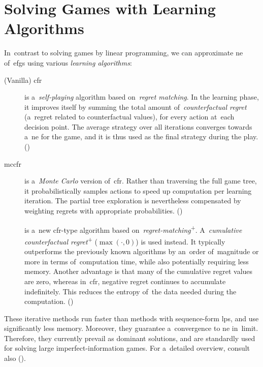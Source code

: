 \section{Solving Games with Learning Algorithms}
In~contrast to solving games by linear programming, we can approximate \acrlong{ne} of~\acrshort{efg}s using various \emph{learning algorithms}:
\begin{description}
  \item [(Vanilla) \acrfull{cfr}] is a~\emph{self-playing} algorithm based on~\emph{regret matching}.
    In the learning phase, it improves itself by summing the total amount of~\emph{counterfactual regret} (a~regret related to counterfactual values), for every action at~each decision point.
    The average strategy over all iterations converges towards a~\acrshort{ne} for the game, and it is thus used as the final strategy during the play.
    (\cite{Zinkevich2007regret})

  \item [\acrfull{mccfr}] is a~\emph{Monte Carlo} version of~\acrshort{cfr}.
    Rather than traversing the full game tree, it probabilistically samples actions to speed up computation per learning iteration.
    The partial tree exploration is nevertheless compensated by weighting regrets with appropriate probabilities.
    (\cite{Johanson2012efficient})

  \item [\cfrplus] is a~new \acrshort{cfr}-type algorithm based on~\emph{regret-matching}\textsuperscript{+}.
    A~\emph{cumulative counterfactual regret}\textsuperscript{+} ($\max(\cdot, 0)$) is used instead.
    It typically outperforms the previously known algorithms by an~order of~magnitude or more in terms of~computation time, while also potentially requiring less memory.
    Another advantage is that many of the cumulative regret values are zero, whereas in~\acrshort{cfr}, negative regret continues to accumulate indefinitely.
    This reduces the entropy of~the data needed during the computation. 
    (\cite{Tammelin2015solving})
\end{description}
These iterative methods run faster than methods with sequence-form \acrshort{lp}s, and use significantly less memory.
Moreover, they guarantee a~convergence to \acrlong{ne} in~limit.
Therefore, they currently prevail as dominant solutions, and are standardly used for solving large imperfect-information games.
For a~detailed overview, consult also (\cite{Bosansky2013solving}).

